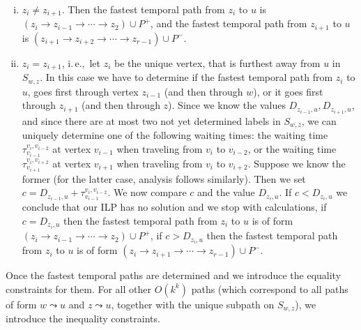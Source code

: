 \documentclass[a4paper,UKenglish,cleveref, autoref, thm-restate]{lipics-v2021}
\newcommand{\ie}{i.\,e.,\ }
\begin{document}
\begin{enumerate}[(i)]
    \item \label{FPT:equality-fromUtoX-twosplit}
    $z_i \neq z_{i+1}$.
    Then the fastest temporal path from $z_i$ to $u$ is 
    $(z_i \rightarrow z_{i-1} \rightarrow \cdots \rightarrow z_2) \cup P^+$,
    and 
    the fastest temporal path from $z_{i+1}$ to $u$ is 
    $(z_{i+1} \rightarrow z_{i+2} \rightarrow \cdots \rightarrow z_{r-1}) \cup P^-$.
    \item \label{FPT:equality-fromUtoX-onesplit}
    $z_i = z_{i+1}$, \ie let $z_i$ be the unique vertex, that is furthest away from $u$ in $S_{w,z}$.
    In this case we have to determine if the fastest temporal path from $z_i$ to $u$, goes first through vertex $z_{i-1}$ (and then through $w$),
    or it goes first through $z_{i+1}$ (and then through $z$).
    Since we know the values $D_{z_{i-1},u}, D_{z_{i+1},u}$,
    and since there are at most two not yet determined labels in $S_{w,z}$,
    we can uniquely determine one of the following
    waiting times:
    the waiting time $\tau_{v_{i-1}} ^{v_{i}, v_{i-2}}$ at vertex $v_{i-1}$ when traveling from $v_i$ to $v_{i-2}$,
    or
    the waiting time $\tau_{v_{i+1}} ^{v_{i}, v_{i+2}}$ at vertex $v_{i+1}$ when traveling from $v_i$ to $v_{i+2}$.
    Suppose we know the former (for the latter case, analysis follows similarly).
    Then we set $c = D_{z_{i-1},u} +  \tau_{v_{i-1}} ^{v_{i}, v_{i-2}}$.
    We now compare $c$ and the value $D_{z_{i},u}$.
    If $c < D_{z_{i},u}$ we conclude that our ILP has no solution and we stop with calculations,
    if $c = D_{z_{i},u}$ then the fastest temporal path from $z_i$ to $u$ is of form $(z_i \rightarrow z_{i-1} \rightarrow \cdots \rightarrow z_2) \cup P^+$,
    if $c > D_{z_{i},u}$ then the fastest temporal path from $z_i$ to $u$ is of form $(z_i \rightarrow z_{i+1} \rightarrow \cdots \rightarrow z_{r-1}) \cup P^-$.
\end{enumerate}
Once the fastest temporal paths are determined and we introduce the equality constraints for them.
For all other $O(k^k)$ paths (which correspond to all paths of form $w \leadsto u$ and $z \leadsto u$, together with the unique subpath on $S_{w,z}$),
we introduce the inequality constraints.
\end{document}
